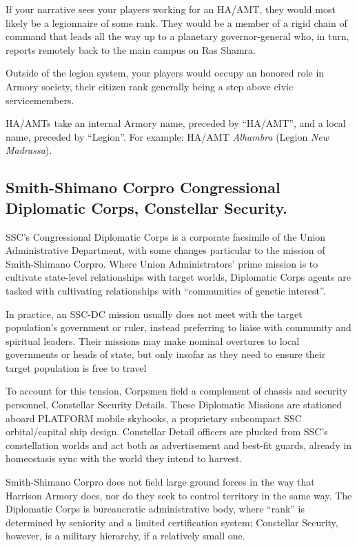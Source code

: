 If your narrative sees your players working for an HA/AMT, they would most likely be a
legionnaire of some rank. They would be a member of a rigid chain of command that leads all the
way up to a planetary governor-general who, in turn, reports remotely back to the main campus
on Ras Shamra.

Outside of the legion system, your players would occupy an honored role in Armory society, their
citizen rank generally being a step above civic servicemembers.

HA/AMTs take an internal Armory name, preceded by ``HA/AMT'', and a local name, preceded by
``Legion''. For example: HA/AMT \textit{Alhambra} (Legion \textit{New Madrassa}).

\subsection{Smith-Shimano Corpro Congressional Diplomatic Corps, Constellar Security.}

SSC's Congressional Diplomatic Corps is a corporate facsimile of the Union Administrative
Department, with some changes particular to the mission of Smith-Shimano Corpro. Where Union
Administrators' prime mission is to cultivate state-level relationships with target worlds, Diplomatic
Corps agents are tasked with cultivating relationships with ``communities of genetic interest''.

In practice, an SSC-DC mission usually does not meet with the target population's government or
ruler, instead preferring to liaise with community and spiritual leaders. Their missions may make
nominal overtures to local governments or heads of state, but only insofar as they need to ensure
their target population is free to travel

To account for this tension, Corpsmen field a complement of chassis and security personnel,
Constellar Security Details. These Diplomatic Missions are stationed aboard PLATFORM mobile
skyhooks, a proprietary subcompact SSC orbital/capital ship design. Constellar Detail officers are
plucked from SSC's constellation worlds and act both as advertisement and best-fit guards,
already in homeostasis sync with the world they intend to harvest.

Smith-Shimano Corpro does not field large ground forces in the way that Harrison Armory does,
nor do they seek to control territory in the same way. The Diplomatic Corps is bureaucratic
administrative body, where ``rank'' is determined by seniority and a limited certification system;
Constellar Security, however, is a military hierarchy, if a relatively small one.


